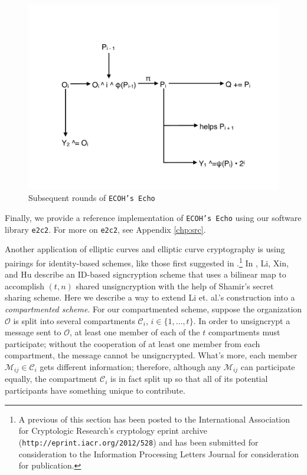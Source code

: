 \begin{figure}[htbp]
    \centering
    \includegraphics[scale=0.5]{figures/ecoh_echo2.pdf}
    \caption{Subsequent rounds of \texttt{ECOH's Echo}}
    \label{fig:other_rounds}
\end{figure}

\newpage
{}
Finally, we provide a reference implementation of \texttt{ECOH's Echo} using
    our software library \texttt{e2c2}.
For more on \texttt{e2c2}, see Appendix \ref{chp:src}.



Another application of elliptic curves and elliptic curve cryptography is using
    pairings for identity-based schemes, like those first suggested in
    \cite{boneh2001identity}.\footnote{A previous of this section has been
    posted to the International Association for Cryptologic Research's
    cryptology eprint archive (\texttt{http://eprint.iacr.org/2012/528}) and
    has been submitted for consideration to the Information Processing Letters
    Journal for consideration for publication.}
In \cite{li2006id}, Li, Xin, and Hu describe an ID-based signcryption scheme
    that uses a bilinear map to accomplish $(t, n)$ shared unsigncryption with
    the help of Shamir's secret sharing scheme.
Here we describe a way to extend Li et. al.'s construction into a
    \textit{compartmented scheme}.
For our compartmented scheme, suppose the organization $\mathcal{O}$ is split
    into several compartments $\mathcal{C}_i$, $i \in \{1, \ldots, t\}$.
In order to unsigncrypt a message sent to $\mathcal{O}$, at least one member of
    each of the $t$ compartments must participate; without the cooperation of
    at least one member from each compartment, the message cannot be
    unsigncrypted.
What's more, each member $\mathcal{M}_{ij} \in \mathcal{C}_i$ gets
    different information; therefore, although any $\mathcal{M}_{ij}$ can
    participate equally, the compartment $\mathcal{C}_i$ is in fact split up
    so that all of its potential participants have something unique to
    contribute.

